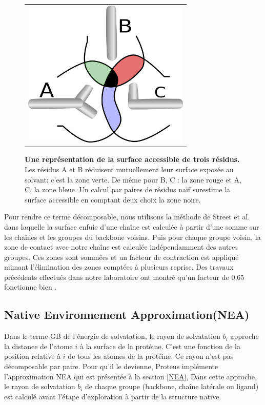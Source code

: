    \begin{figure}[!htbp]
     \centering
     \begin{tabular}{c}
       \includegraphics[width=8cm]{figure/intersurface.png} 
     \end{tabular}
     
     \caption{\textbf{Une représentation de la surface accessible de trois résidus.} Les résidus A et B réduisent mutuellement leur surface exposée au solvant: c'est la zone verte. De même pour B, C : la zone rouge et  A, C, la zone bleue. Un calcul par paires de résidus naïf surestime la surface accessible en comptant deux choix la zone noire. }
\label{fig:intersurf}
   \end{figure}


Pour rendre ce terme décomposable, nous utilisons la méthode de Street et al. \cite{Street98} dans laquelle la surface enfuie d'une chaîne est calculée à partir d'une somme sur les chaînes et les groupes du backbone voisins. Puis pour chaque groupe voisin, la zone de contact avec notre chaîne est calculée indépendamment des autres groupes. Ces zones sont sommées et un facteur de contraction est appliqué mimant l'élimination des zones comptées à plusieurs reprise. Des travaux précédents effectués dans notre laboratoire ont montré qu'un facteur de 0,65 fonctionne bien \cite{Lopes07,Gaillard14}.   


\subsection{\og Native Environnement Approximation\fg (NEA)}

Dans le terme GB de l'énergie de solvatation, le rayon de solvatation $b_i$ approche la distance de l'atome $i$ à la surface de la protéine. C'est une fonction de la position relative à $i$ de tous les atomes de la protéine. Ce rayon n'est pas décomposable par paire. Pour qu'il le devienne, Proteus implémente l'approximation  NEA qui est présentée à  la section \ref{NEA}, 
Dans cette approche, le rayon de solvatation $b_i$ de chaque groupe (backbone, chaîne latérale ou ligand)  est calculé avant l'étape d'exploration à partir de la structure native.

